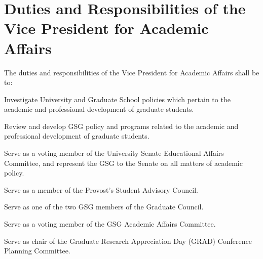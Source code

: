 \section{Duties and Responsibilities of the Vice President for Academic Affairs}
The duties and responsibilities of the Vice President for Academic Affairs shall be to:
\begin{bylaws-number}
  \item Investigate University and Graduate School policies which pertain to the academic and professional development of graduate students.
  \item Review and develop GSG policy and programs related to the academic and professional development of graduate students.
  \item Serve as a voting member of the University Senate Educational Affairs Committee, and represent the GSG to the Senate on all matters of academic policy.
  \item Serve as a member of the Provost’s Student Advisory Council.
  \item Serve as one of the two GSG members of the Graduate Council.
  \item Serve as a voting member of the GSG Academic Affairs Committee.
\item Serve as chair of the Graduate Research Appreciation Day (GRAD) Conference Planning Committee.
\end{bylaws-number}

